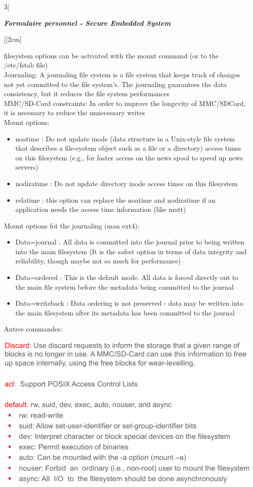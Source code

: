\begin{multicols}{3}[\centerline{ \large\em \textbf{Formulaire personnel - Secure Embedded System}}][2cm]
\begin{itemize}
\begin{minipage}{\linewidth}
\end{minipage}
\end{itemize}
filesystem options can be activated with the mount command (or to the
/etc/fstab file)\\
Journaling: A journaling file system is a file system that keeps track of changes not yet committed to the file system's. The journaling guarantees the data consistency, but it reduces the file system performances\\
MMC/SD-Card constraints: In order to improve the longevity of MMC/SDCard, it is necessary to reduce the unnecessary writes\\
Mount options:
\begin{itemize}
\item noatime : Do not update inode (data structure in a Unix-style file system that describes a file-system object such as a file or a directory) access times on this filesystem (e.g., for faster access on the news spool to speed up news servers)
\item nodiratime : Do not update directory inode access times on this filesystem
\item relatime : this option can replace the noatime and nodiratime if an application needs the access time information (like mutt)
\end{itemize}
Mount options fot the journaling (man ext4):
\begin{itemize}
\item Data=journal : All data is committed into the journal prior to being written into the main filesystem (It is the safest option in terms of data integrity and reliability, though maybe not so much for performance)
\item Data=ordered :  This is the default mode. All data is forced directly out to the main file system before the metadata being committed to the journal
\item Data=writeback :  Data ordering is not preserved - data may be written into the main filesystem after its metadata has been committed to the journal
\end{itemize}
Autres commandes:\\
\begin{minipage}{\linewidth}
	\centering
    \includegraphics[width =0.8\columnwidth]{images/27.png}

\end{minipage}
\end{multicols}
